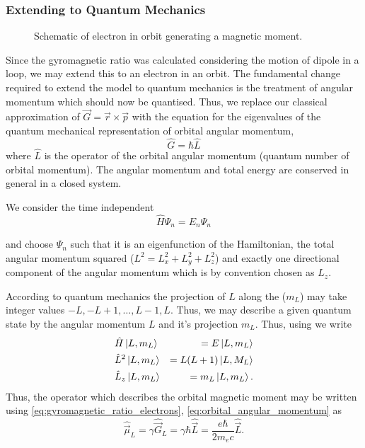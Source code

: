 \subsubsection{Extending to Quantum Mechanics}
\begin{wrapfigure}{r}{0.4\textwidth}%
	\begin{center}
		
		\caption{Schematic of electron in orbit generating a magnetic moment.}%
	\end{center}
\end{wrapfigure}%
Since the gyromagnetic ratio was calculated considering the motion of dipole in a loop, we may extend this to an electron in an orbit.
The fundamental change required to extend the model to quantum mechanics is the treatment of angular momentum which should now be quantised.
Thus, we replace our classical approximation of $\vec{G} = \vec{r} \times \vec{p}$ with the equation for the eigenvalues of the quantum mechanical representation of orbital angular momentum,
\begin{equation}
	\hat{G} = \hbar \hat{L}
	\label{eq:orbital_angular_momentum}
\end{equation}
where $\hat{L}$ is the operator of the orbital angular momentum (quantum number of orbital momentum).
The angular momentum and total energy are conserved in general in a closed system.

We consider the time independent 
\begin{equation}
	\hat{H} \Psi_n = E_n \Psi_n
	\label{eq:TISE}
\end{equation}

and choose $\Psi_n$ such that it is an eigenfunction of the Hamiltonian, the total angular momentum squared ($L^2 = L_x^2 + L_y^2 + L_z^2$) and exactly one directional component of the angular momentum which is by convention chosen as $L_z$.

According to quantum mechanics the projection of $L$ along the  ($m_L$) may take integer values $-L, -L + 1, \dots, L-1, L$.
Thus, we may describe a given quantum state by the angular momentum $L$ and it's projection $m_L$. Thus, using  we write
\begin{eqnarray}
	&\hat{H}\ket{L, m_L} &= E\ket{L, m_L} \\
	&\hat{L}^2\ket{L, m_L} &= L(L+1)\ket{L, M_L} \\
	&\hat{L}_z\ket{L, m_L} &= m_L\ket{L, m_L}. \label{eq:zthcomponent}
\end{eqnarray}
Thus, the operator which describes the orbital magnetic moment may be written using  \eqref{eq:gyromagnetic_ratio_electrons}, \eqref{eq:orbital_angular_momentum} as
\begin{equation}
	\hat{\vec{\mu}}_L = \gamma \hat{\vec{G}}_L = \gamma \hbar \hat{\vec{L}} = \frac{e\hbar}{2m_e c}\hat{\vec{L}}.
	\label{eq:orbital_magnetic_moment_operator}
\end{equation}

